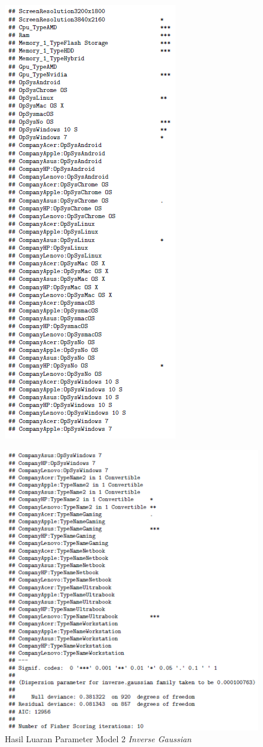 \documentclass[12pt]{article}
\begin{document}
\begin{figure}[h!]
    \centering
    \includegraphics{Model_4_Sum(4_3).png}
    \label{fig:sum44}
\end{figure}
\begin{figure}[h!]
    \centering
    \includegraphics{Model_4_Sum(5_3).png}
    \caption{Hasil Luaran Parameter Model 2 \textit{Inverse Gaussian}}
    \label{fig:sum45}
\end{figure}
\end{document}
